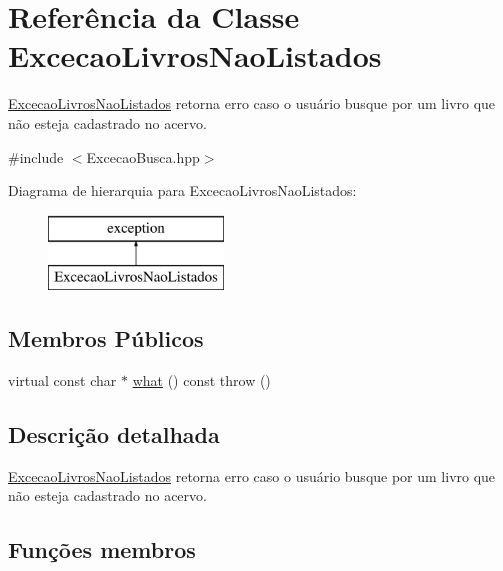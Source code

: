 \hypertarget{class_excecao_livros_nao_listados}{}\section{Referência da Classe Excecao\+Livros\+Nao\+Listados}
\label{class_excecao_livros_nao_listados}


\mbox{\hyperlink{class_excecao_livros_nao_listados}{Excecao\+Livros\+Nao\+Listados}} retorna erro caso o usuário busque por um livro que não esteja cadastrado no acervo.  




{\ttfamily \#include $<$Excecao\+Busca.\+hpp$>$}

Diagrama de hierarquia para Excecao\+Livros\+Nao\+Listados\+:\begin{figure}[H]
\begin{center}
\leavevmode
\includegraphics[height=2.000000cm]{class_excecao_livros_nao_listados}
\end{center}
\end{figure}
\subsection*{Membros Públicos}
\begin{DoxyCompactItemize}
\item 
virtual const char $\ast$ \mbox{\hyperlink{class_excecao_livros_nao_listados_aac03d8330a17f90a43182d03022150f6}{what}} () const  throw ()
\end{DoxyCompactItemize}


\subsection{Descrição detalhada}
\mbox{\hyperlink{class_excecao_livros_nao_listados}{Excecao\+Livros\+Nao\+Listados}} retorna erro caso o usuário busque por um livro que não esteja cadastrado no acervo. 

\subsection{Funções membros}
\mbox{\label{class_excecao_livros_nao_listados_aac03d8330a17f90a43182d03022150f6}} 
